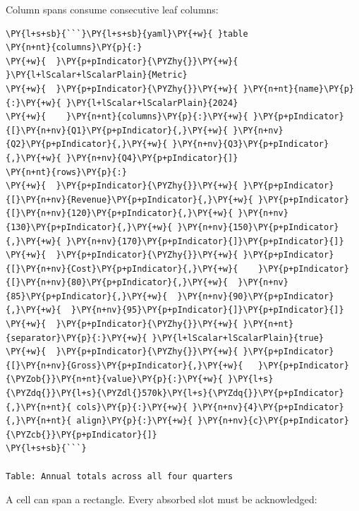 \documentclass[a4paper,twoside]{article}
\begin{document}
Column spans consume consecutive leaf columns:
\begin{tscode}[lang=markdown, engine=pygments]
\begin{Verbatim}[commandchars=\\\{\},breaklines, breakanywhere, commandchars=\\\{\}]
\PY{l+s+sb}{```}\PY{l+s+sb}{yaml}\PY{+w}{ }table
\PY{n+nt}{columns}\PY{p}{:}
\PY{+w}{  }\PY{p+pIndicator}{\PYZhy{}}\PY{+w}{ }\PY{l+lScalar+lScalarPlain}{Metric}
\PY{+w}{  }\PY{p+pIndicator}{\PYZhy{}}\PY{+w}{ }\PY{n+nt}{name}\PY{p}{:}\PY{+w}{ }\PY{l+lScalar+lScalarPlain}{2024}
\PY{+w}{    }\PY{n+nt}{columns}\PY{p}{:}\PY{+w}{ }\PY{p+pIndicator}{[}\PY{n+nv}{Q1}\PY{p+pIndicator}{,}\PY{+w}{ }\PY{n+nv}{Q2}\PY{p+pIndicator}{,}\PY{+w}{ }\PY{n+nv}{Q3}\PY{p+pIndicator}{,}\PY{+w}{ }\PY{n+nv}{Q4}\PY{p+pIndicator}{]}
\PY{n+nt}{rows}\PY{p}{:}
\PY{+w}{  }\PY{p+pIndicator}{\PYZhy{}}\PY{+w}{ }\PY{p+pIndicator}{[}\PY{n+nv}{Revenue}\PY{p+pIndicator}{,}\PY{+w}{ }\PY{p+pIndicator}{[}\PY{n+nv}{120}\PY{p+pIndicator}{,}\PY{+w}{ }\PY{n+nv}{130}\PY{p+pIndicator}{,}\PY{+w}{ }\PY{n+nv}{150}\PY{p+pIndicator}{,}\PY{+w}{ }\PY{n+nv}{170}\PY{p+pIndicator}{]}\PY{p+pIndicator}{]}
\PY{+w}{  }\PY{p+pIndicator}{\PYZhy{}}\PY{+w}{ }\PY{p+pIndicator}{[}\PY{n+nv}{Cost}\PY{p+pIndicator}{,}\PY{+w}{    }\PY{p+pIndicator}{[}\PY{n+nv}{80}\PY{p+pIndicator}{,}\PY{+w}{  }\PY{n+nv}{85}\PY{p+pIndicator}{,}\PY{+w}{  }\PY{n+nv}{90}\PY{p+pIndicator}{,}\PY{+w}{  }\PY{n+nv}{95}\PY{p+pIndicator}{]}\PY{p+pIndicator}{]}
\PY{+w}{  }\PY{p+pIndicator}{\PYZhy{}}\PY{+w}{ }\PY{n+nt}{separator}\PY{p}{:}\PY{+w}{ }\PY{l+lScalar+lScalarPlain}{true}
\PY{+w}{  }\PY{p+pIndicator}{\PYZhy{}}\PY{+w}{ }\PY{p+pIndicator}{[}\PY{n+nv}{Gross}\PY{p+pIndicator}{,}\PY{+w}{   }\PY{p+pIndicator}{\PYZob{}}\PY{n+nt}{value}\PY{p}{:}\PY{+w}{ }\PY{l+s}{\PYZdq{}}\PY{l+s}{\PYZdl{}570k}\PY{l+s}{\PYZdq{}}\PY{p+pIndicator}{,}\PY{n+nt}{ cols}\PY{p}{:}\PY{+w}{ }\PY{n+nv}{4}\PY{p+pIndicator}{,}\PY{n+nt}{ align}\PY{p}{:}\PY{+w}{ }\PY{n+nv}{c}\PY{p+pIndicator}{\PYZcb{}}\PY{p+pIndicator}{]}
\PY{l+s+sb}{```}

Table: Annual totals across all four quarters
\end{Verbatim}
\end{tscode}
A cell can span a rectangle. Every absorbed slot must be acknowledged:
\end{document}
